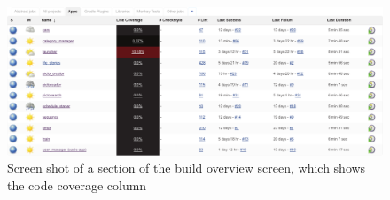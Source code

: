 \begin{figure}[htbp]
    \includegraphics[width=\textwidth]{graphics/jenkins-overview-coco.pdf}
    \caption{Screen shot of a section of the build overview screen, which shows the code coverage column}
    \label{fig:jenkins-overview-coco}
\end{figure}